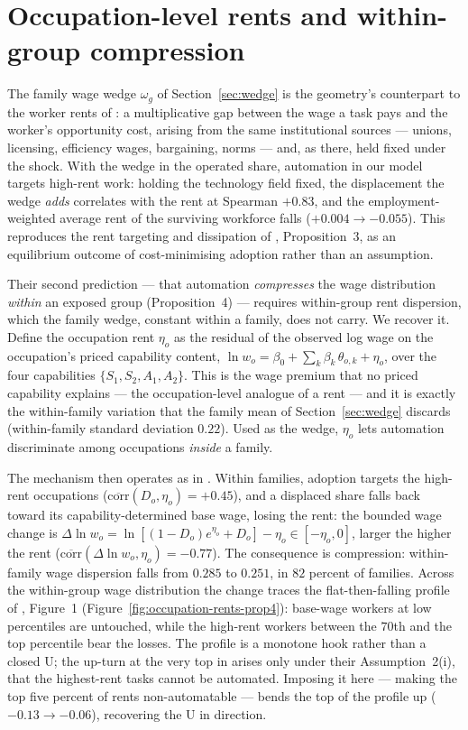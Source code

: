 \section{Occupation-level rents and within-group compression}
\label{sec:occupation-rents}

The family wage wedge $\omega_g$ of Section~\ref{sec:wedge} is the
geometry's counterpart to the worker rents of \textcite{acemoglu2024rents}: a
multiplicative gap between the wage a task pays and the worker's opportunity
cost, arising from the same institutional sources --- unions, licensing,
efficiency wages, bargaining, norms --- and, as there, held fixed under the
shock. With the wedge in the operated share, automation in our model targets
high-rent work: holding the technology field fixed, the displacement the wedge
\emph{adds} correlates with the rent at Spearman $+0.83$, and the
employment-weighted average rent of the surviving workforce falls
($+0.004 \to -0.055$). This reproduces the rent targeting and dissipation of
\textcite{acemoglu2024rents}, Proposition~3, as an equilibrium outcome of
cost-minimising adoption rather than an assumption.

Their second prediction --- that automation \emph{compresses} the wage
distribution \emph{within} an exposed group (Proposition~4) --- requires
within-group rent dispersion, which the family wedge, constant within a family,
does not carry. We recover it. Define the occupation rent $\eta_o$ as the
residual of the observed log wage on the occupation's priced capability content,
$\ln w_o = \beta_0 + \sum_k \beta_k\, \theta_{o,k} + \eta_o$, over the four
capabilities $\{S_1,S_2,A_1,A_2\}$. This is the wage premium that no priced
capability explains --- the occupation-level analogue of a rent --- and it is
exactly the within-family variation that the family mean of
Section~\ref{sec:wedge} discards (within-family standard deviation
$0.22$). Used as the wedge, $\eta_o$ lets automation discriminate among
occupations \emph{inside} a family.

The mechanism then operates as in \textcite{acemoglu2024rents}. Within families,
adoption targets the high-rent occupations
($\overline{\mathrm{corr}}(D_o,\eta_o) = +0.45$), and a displaced share falls
back toward its capability-determined base wage, losing the rent: the bounded
wage change is $\Delta\ln w_o = \ln[(1-D_o)e^{\eta_o} + D_o] - \eta_o \in
[-\eta_o, 0]$, larger the higher the rent
($\overline{\mathrm{corr}}(\Delta\ln w_o,\eta_o) = -0.77$). The consequence is
compression: within-family wage dispersion falls from $0.285$ to $0.251$, in
$82$ percent of families. Across the within-group wage distribution the change
traces the flat-then-falling profile of \textcite{acemoglu2024rents}, Figure~1
(Figure~\ref{fig:occupation-rents-prop4}): base-wage workers at low percentiles
are untouched, while the high-rent workers between the $70$th and the top
percentile bear the losses. The profile is a monotone hook rather than a closed
U; the up-turn at the very top in \textcite{acemoglu2024rents} arises only under
their Assumption~2(i), that the highest-rent tasks cannot be automated. Imposing
it here --- making the top five percent of rents non-automatable --- bends the
top of the profile up ($-0.13 \to -0.06$), recovering the U in direction.

